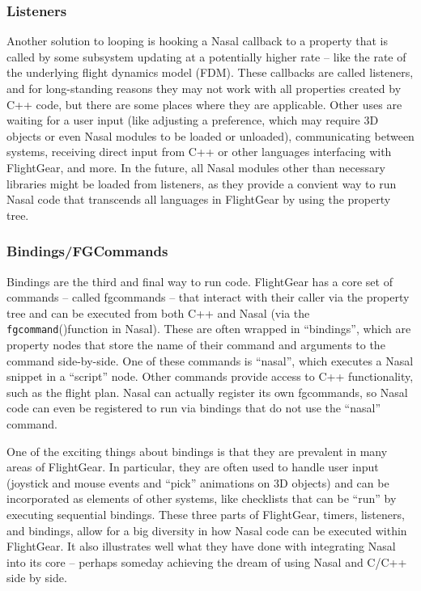 \documentclass{article}
\newcommand{\func}[1]{\textcolor{func}{\tt #1}}
\newcommand{\fp}{\textcolor{func}{()}}
\begin{document}
\subsubsection{Listeners}
Another solution to looping is hooking a Nasal callback to a property that is called by some subsystem updating at a potentially higher rate -- like the rate of the underlying flight dynamics model (FDM).  These callbacks are called listeners, and for long-standing reasons they may not work with all properties created by C++ code, but there are some places where they are applicable.  Other uses are waiting for a user input (like adjusting a preference, which may require 3D objects or even Nasal modules to be loaded or unloaded), communicating between systems, receiving direct input from C++ or other languages interfacing with FlightGear, and more.  In the future, all Nasal modules other than necessary libraries might be loaded from listeners, as they provide a convient way to run Nasal code that transcends all languages in FlightGear by using the property tree.
\subsubsection{Bindings/FGCommands}
Bindings are the third and final way to run code.  FlightGear has a core set of commands -- called fgcommands -- that interact with their caller via the property tree and can be executed from both C++ and Nasal (via the \func{fgcommand}\fp function in Nasal).  These are often wrapped in ``bindings'', which are property nodes that store the name of their command and arguments to the command side-by-side.  One of these commands is ``nasal'', which executes a Nasal snippet in a ``script'' node.  Other commands provide access to C++ functionality, such as the flight plan.  Nasal can actually register its own fgcommands, so Nasal code can even be registered to run via bindings that do not use the ``nasal'' command.

One of the exciting things about bindings is that they are prevalent in many areas of FlightGear.  In particular, they are often used to handle user input (joystick and mouse events and ``pick'' animations on 3D objects) and can be incorporated as elements of other systems, like checklists that can be ``run'' by executing sequential bindings.  These three parts of FlightGear, timers, listeners, and bindings, allow for a big diversity in how Nasal code can be executed within FlightGear.  It also illustrates well what they have done with integrating Nasal into its core -- perhaps someday achieving the dream of using Nasal and C/C++ side by side.
\end{document}
